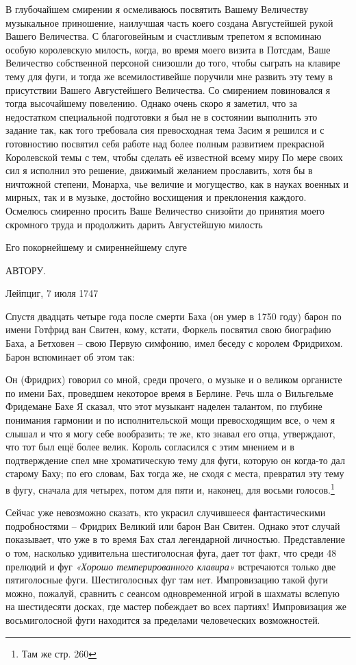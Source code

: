 \documentclass[../main.tex]{subfiles}
\begin{document}
В глубочайшем смирении я осмеливаюсь посвятить Вашему Величеству музыкальное приношение, наилучшая часть коего создана Августейшей рукой Вашего Величества. С благоговейным и счастливым трепетом я вспоминаю особую королевскую милость, когда, во время моего визита в Потсдам, Ваше Величество собственной персоной снизошли до того, чтобы сыграть на клавире тему для фуги, и тогда же всемилостивейше поручили мне развить эту тему в присутствии Вашего Августейшего Величества. Со смирением повиновался я тогда высочайшему повелению. Однако очень скоро я заметил, что за недостатком специальной подготовки я был не в состоянии выполнить это задание так, как того требовала сия превосходная тема Засим я решился и с готовностию посвятил себя работе над более полным развитием прекрасной Королевской темы с тем, чтобы сделать её известной всему миру По мере своих сил я исполнил это решение, движимый желанием прославить, хотя бы в ничтожной степени, Монарха, чье величие и могущество, как в науках военных и мирных, так и в музыке, достойно восхищения и преклонения каждого. Осмелюсь смиренно просить Ваше Величество снизойти до принятия моего скромного труда и продолжить дарить Августейшую милость

Его покорнейшему и смиреннейшему слуге

АВТОРУ.

Лейпциг, 7 июля 1747

Спустя двадцать четыре года после смерти Баха (он умер в 1750 году) барон по имени Готфрид ван Свитен, кому, кстати, Форкель посвятил свою биографию Баха, а Бетховен \--- свою Первую симфонию, имел беседу с королем Фридрихом. Барон вспоминает об этом так:

Он (Фридрих) говорил со мной, среди прочего, о музыке и о великом органисте по имени Бах, проведшем некоторое время в Берлине. Речь шла о Вильгельме Фридемане Бахе Я сказал, что этот музыкант наделен талантом, по глубине понимания гармонии и по исполнительской мощи превосходящим все, о чем я слышал и что я могу себе вообразить; те же, кто знавал его отца, утверждают, что тот был ещё более велик. Король согласился с этим мнением и в подтверждение спел мне хроматическую тему для фуги, которую он когда-то дал старому Баху; по его словам, Бах тогда же, не сходя с места, превратил эту тему в фугу, сначала для четырех, потом для пяти и, наконец, для восьми голосов.\footnote{Там же стр. 260}

Сейчас уже невозможно сказать, кто украсил случившееся фантастическими подробностями \--- Фридрих Великий или барон Ван Свитен. Однако этот случай показывает, что уже в то время Бах стал легендарной личностью. Представление о том, насколько удивительна шестиголосная фуга, дает тот факт, что среди 48 прелюдий и фуг \emph{«Хорошо темперированного клавира»} встречаются только две пятиголосные фуги. Шестиголосных фуг там нет. Импровизацию такой фуги можно, пожалуй, сравнить с сеансом одновременной игрой в шахматы вслепую на шестидесяти досках, где мастер побеждает во всех партиях! Импровизация же восьмиголосной фуги находится за пределами человеческих возможностей.
\end{document}
